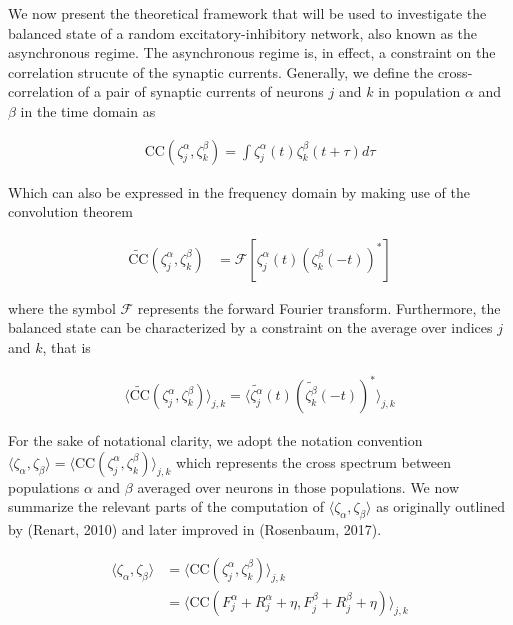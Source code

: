 \documentclass{ucetd}
\begin{document}
We now present the theoretical framework that will be used to investigate the balanced state of a random excitatory-inhibitory network, also known as the asynchronous regime. The asynchronous regime is, in effect, a constraint on the correlation strucute of the synaptic currents. Generally, we define the cross-correlation of a pair of synaptic currents of neurons $j$ and $k$ in population $\alpha$ and $\beta$ in the time domain as

\begin{align}
\mathrm{CC}(\zeta_{j}^{\alpha},\zeta_{k}^{\beta}) = \int \zeta_{j}^{\alpha}(t)\zeta_{k}^{\beta}(t+\tau)d\tau
\end{align}

Which can also be expressed in the frequency domain by making use of the convolution theorem

\begin{align}
\widetilde{\mathrm{CC}}(\zeta_{j}^{\alpha},\zeta_{k}^{\beta})  &= \mathcal{F}\left[\zeta_{j}^{\alpha}(t)(\zeta_{k}^{\beta}(-t))^{*}\right] 
\end{align}

where the symbol $\mathcal{F}$ represents the forward Fourier transform. Furthermore, the balanced state can be characterized by a constraint on the average over indices $j$ and $k$, that is 

\begin{align}
\langle \widetilde{\mathrm{CC}}(\zeta_{j}^{\alpha},\zeta_{k}^{\beta})\rangle_{j,k} = \langle \widetilde{\zeta_{j}^{\alpha}}(t)(\widetilde{\zeta_{k}^{\beta}}(-t))^{*} \rangle_{j,k}
\end{align}

For the sake of notational clarity, we adopt the notation convention $\langle \zeta_{\alpha}, \zeta_{\beta}\rangle = \langle \mathrm{CC}(\zeta_{j}^{\alpha},\zeta_{k}^{\beta})\rangle_{j,k}$ which represents the cross spectrum between populations $\alpha$ and $\beta$ averaged over neurons in those populations. We now summarize the relevant parts of the computation of $\langle \zeta_{\alpha}, \zeta_{\beta}\rangle$ as originally outlined by (Renart, 2010) and later improved in (Rosenbaum, 2017).

\begin{align}
\langle \zeta_{\alpha}, \zeta_{\beta}\rangle &= \langle \mathrm{CC}(\zeta_{j}^{\alpha},\zeta_{k}^{\beta})\rangle_{j,k}\\
&= \langle \mathrm{CC}(F_{j}^{\alpha} + R_{j}^{\alpha} + \eta,F_{j}^{\beta} + R_{j}^{\beta} + \eta)\rangle_{j,k}
\end{align}
\end{document}
